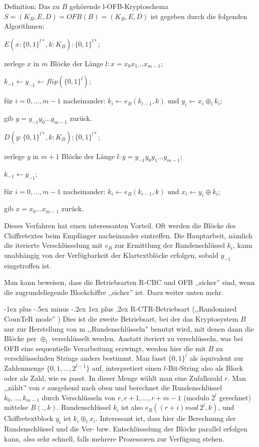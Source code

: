 \documentclass[a4paper]{article}
\makeatletter
\renewcommand{\subsubsection}{\@startsection{subsubsection}{3}{0mm}%
 {-1ex plus -.5ex minus -.2ex}%
 {1ex plus .2ex}%
 {\normalfont\small\bfseries}}
\makeatother
\begin{document}
\begin{multicols}{3}
    Definition: Das zu $B$ gehörende l-OFB-Kryptoschema $S=(K_B,E,D) =OFB(B) =(K_B,E,D)$ ist gegeben durch die folgenden Algorithmen:
    \begin{itemize*}
        \item $E(x:\{0,1\}^{l*},k:K_B) :\{0,1\}^{l*}$;
        \item zerlege $x$ in $m$ Blöcke der Länge $l:x=x_0 x_1 ...x_{m-1}$;
        \item $k_{-1} \leftarrow y_{-1} \leftarrow flip(\{0,1\}^l)$;
        \item für $i=0,...,m-1$ nacheinander: $k_i\leftarrow e_B(k_{i-1},k)$ und $y_i\leftarrow x_i\oplus_l k_i$;
        \item gib $y=y_{-1} y_0 ...y_{m-1}$ zurück.
        \item $D(y:\{0,1\}^{l*},k:K_B) :\{0,1\}^{l*}$;
        \item zerlege $y$ in $m+1$ Blöcke der Länge $l:y=y_{-1} y_0 y_1 ...y_{m-1}$;
        \item $k_{-1} \leftarrow y_{-1}$;
        \item für $i=0,...,m-1$ nacheinander: $k_i\leftarrow e_B(k_{i-1} ,k)$ und $x_i\leftarrow y_i\oplus k_i$;
        \item gib $x=x_0 ...x_{m-1}$ zurück.
    \end{itemize*}

    Dieses Verfahren hat einen interessanten Vorteil. Oft werden die Blöcke des Chiffretextes beim Empfänger nacheinander eintreffen. Die Hauptarbeit, nämlich die iterierte Verschlüsselung mit $e_B$ zur Ermittlung der Rundenschlüssel $k_i$, kann unabhängig von der Verfügbarkeit der Klartextblöcke erfolgen, sobald $y_{-1}$ eingetroffen ist.

    Man kann beweisen, dass die Betriebsarten R-CBC und OFB ,,sicher'' sind, wenn die zugrundeliegende Blockchiffre ,,sicher'' ist. Dazu weiter unten mehr.

    \subsubsection{R-CTR-Betriebsart (,,Randomized CounTeR mode'' )}
    Dies ist die zweite Betriebsart, bei der das Kryptosystem $B$ nur zur Herstellung von m ,,Rundenschlüsseln'' benutzt wird, mit denen dann die Blöcke per $\oplus_l$ verschlüsselt werden. Anstatt iteriert zu verschlüsseln, was bei OFB eine sequentielle Verarbeitung erzwingt, werden hier die mit $B$ zu verschlüsselnden Strings anders bestimmt. Man fasst $\{0,1\}^l$ als äquivalent zur Zahlenmenge $\{0,1,...,2^{l-1}\}$ auf, interpretiert einen $l$-Bit-String also als Block oder als Zahl, wie es passt. In dieser Menge wählt man  eine Zufallszahl $r$. Man ,,zählt'' von $r$ ausgehend nach oben und berechnet die Rundenschlüssel $k_0,...,k_{m-1}$ durch Verschlüsseln von $r,r+1,...,r+m-1$ (modulo $2^l$ gerechnet) mittelse $B(.,k)$. Rundenschlüssel $k_i$ ist also $e_B((r+i) mod\ 2^l,k)$, und Chiffretextblock $y_i$ ist $k_i\oplus_l x_i$. Interessant ist, dass hier die Berechnung der Rundenschlüssel und die Ver- bzw. Entschlüsselung der Blöcke parallel erfolgen kann, also sehr schnell, falls mehrere Prozessoren zur Verfügung stehen.


\end{multicols}
\end{document}
